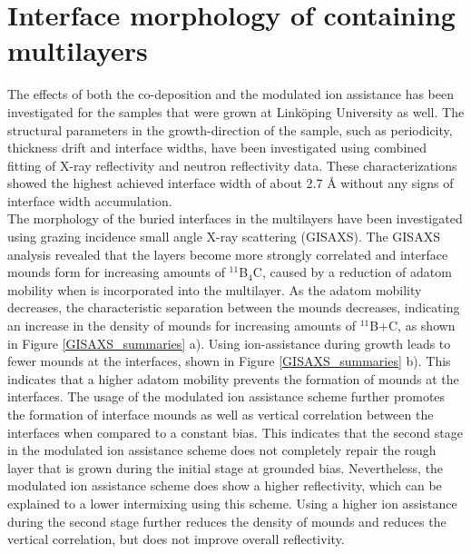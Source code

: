 \section{Interface morphology of \BC containing multilayers}
The effects of both the \BC co-deposition and the modulated ion assistance has been investigated for the samples that were grown at Linköping University as well. The structural parameters in the growth-direction of the sample, such as periodicity, thickness drift and interface widths, have been investigated using combined fitting of X-ray reflectivity and neutron reflectivity data. These characterizations showed the highest achieved interface width of about 2.7 Å without any signs of interface width accumulation. \\
The morphology of the buried interfaces in the multilayers have been investigated using grazing incidence small angle X-ray scattering (GISAXS). The GISAXS analysis revealed that the layers become more strongly correlated and interface mounds form for increasing amounts of $^{\textrm{11}}$B$_\textrm{4}$C, caused by a reduction of adatom mobility when \BC is incorporated into the multilayer. As the adatom mobility decreases, the characteristic separation between the mounds decreases, indicating an increase in the density of mounds for increasing amounts of $^{\textrm{11}}$B+C, as shown in Figure \ref{GISAXS_summaries} a). Using ion-assistance during growth leads to fewer mounds at the interfaces, shown in Figure \ref{GISAXS_summaries} b). This indicates that a higher adatom mobility prevents the formation of mounds at the interfaces. The usage of the modulated ion assistance scheme further promotes the formation of interface mounds as well as vertical correlation between the interfaces when compared to a constant bias. This indicates that the second stage in the modulated ion assistance scheme does not completely repair the rough layer that is grown during the initial stage at grounded bias. Nevertheless, the modulated ion assistance scheme does show a higher reflectivity, which can be explained to a lower intermixing using this scheme. Using a higher ion assistance during the second stage further reduces the density of mounds and reduces the vertical correlation, but does not improve overall reflectivity.
